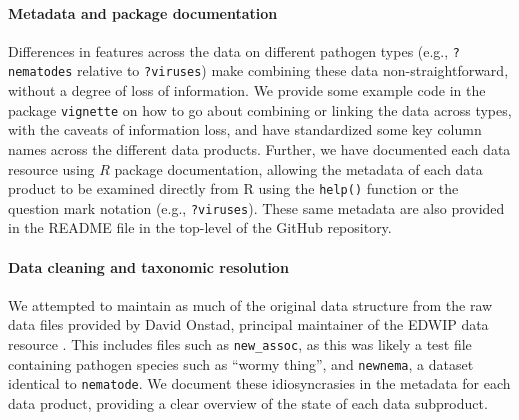 \documentclass[12pt]{article}
\begin{document}
\paragraph*{Metadata and package documentation}

Differences in features across the data on different pathogen types (e.g., \texttt{?nematodes} relative to \texttt{?viruses}) make combining these data non-straightforward, without a degree of loss of information. We provide some example code in the package \texttt{vignette} on how to go about combining or linking the data across types, with the caveats of information loss, and have standardized some key column names across the different data products. Further, we have documented each data resource using $R$ package documentation, allowing the metadata of each data product to be examined directly from R using the \texttt{help()} function or the question mark notation (e.g., \texttt{?viruses}). These same metadata are also provided in the README file in the top-level of the GitHub repository. 




\paragraph*{Data cleaning and taxonomic resolution}

We attempted to maintain as much of the original data structure from the raw data files provided by David Onstad, principal maintainer of the EDWIP data resource \citep{onstad1997}. This includes files such as \texttt{new\_assoc}, as this was likely a test file containing pathogen species such as ``wormy thing'', and \texttt{newnema}, a dataset identical to \texttt{nematode}. We document these idiosyncrasies in the metadata for each data product, providing a clear overview of the state of each data subproduct. 
\end{document}
